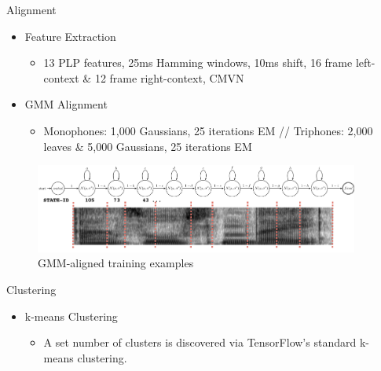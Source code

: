 \documentclass[final]{beamer} %
\newlength{\columnheight}
\begin{document}
\begin{frame}
\begin{columns}
\begin{column}{0.23\textwidth}
{        \vfill
        
      } %
    \end{column}

    \begin{column}{0.23\textwidth}

      \parbox[t][\columnheight]{.9\textwidth}{
        
        \vspace{.4cm}

        \begin{block}{\boxnumber Alignment}
          \begin{itemize}
          \item Feature Extraction
            \begin{itemize}
            \item 13 PLP features, 25ms Hamming windows, 10ms shift, 16 frame left-context \& 12 frame right-context, CMVN
            \end{itemize}
          \item GMM Alignment
            \begin{itemize}
            \item Monophones: 1,000 Gaussians, 25 iterations EM // Triphones: 2,000 leaves \& 5,000 Gaussians, 25 iterations EM
            \end{itemize}
          \end{itemize}
        \end{block}
  
        \vfill
        
        \begin{figure}[!htbp]
          \centering
          \includegraphics[width=\linewidth]{figs/aligned.png}
          \caption{GMM-aligned training examples}
          \endminipage\hfill
        \end{figure}
        
        \vfill
        
        \begin{block}{\boxnumber Clustering}            
          \begin{itemize}
          \item k-means Clustering
            \begin{itemize}
            \item A set number of clusters is discovered via TensorFlow's standard k-means clustering.
            \end{itemize}
          \end{itemize}
        \end{block}

}
\end{column}
\end{columns}
\end{frame}
\end{document}
